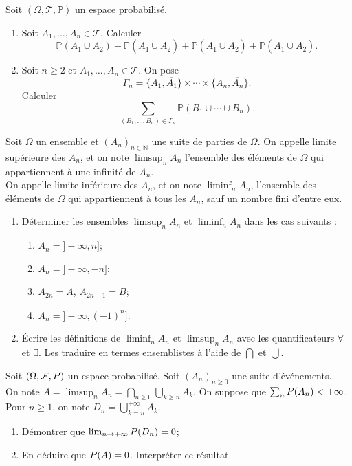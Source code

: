 \documentclass[../PolyS4.tex]{subfiles}
\begin{document}
Soit $(\Omega,\mathcal T,\mathbb{P})$ un espace probabilisé.
\begin{enumerate}
\item Soit $A_1,\dots,A_n\in\mathcal T.$ Calculer 
$$\mathbb{P}(A_1\cup A_2)+\mathbb{P}(\overline{A_1}\cup A_2)+\mathbb{P}(A_1\cup \overline{A_2})+\mathbb{P}(\overline{A_1}\cup\overline{A_2}).$$
\item Soit $n\geq 2$ et $A_1,\dots,A_n\in\mathcal T.$ On pose 
$$\Gamma_n=\{A_1,\overline{A_1}\}\times\cdots\times \{A_n,\overline{A_n}\}.$$
Calculer 
$$\sum_{(B_1,\dots,B_n)\in\Gamma_n}\mathbb{P}(B_1\cup\cdots\cup B_n).$$
\end{enumerate}




Soit $\Omega$ un ensemble et $(A_n)_{n\in\mathbb N}$ une suite de parties de $\Omega$. On appelle limite supérieure des $A_n$, et on note $\limsup_n A_n$ l'ensemble des éléments de $\Omega$ qui appartiennent à une infinité de $A_n$.\\ 
On appelle limite inférieure des $A_n$, et on note $\liminf_n A_n$, l'ensemble des éléments de $\Omega$ qui appartiennent à tous les $A_n$, sauf un nombre fini d'entre eux.\\
\begin{enumerate}
 \item Déterminer les ensembles $\limsup_n A_n$ et $\liminf_n A_n$ dans les cas suivants :
\begin{enumerate}
\item $A_n=]-\infty,n]$;
\item $A_n=]-\infty,-n]$;
\item $A_{2n}=A$, $A_{2n+1}=B$;
\item $A_n=]-\infty,(-1)^n]$. 
\end{enumerate}
\item \'Ecrire les définitions de $\liminf_n A_n$ et $\limsup_n A_n$ avec les quantificateurs
$\forall$ et $\exists$. Les traduire en termes ensemblistes à l'aide de $\bigcap$ et $\bigcup$.\\
\end{enumerate}





Soit $(\Omega,\mathcal F,\mathbb \mathbb{P})$ un espace probabilisé. Soit $(A_n)_{n\geq 0}$ une suite d'événements.\\
On note $A=\limsup_n A_n=\bigcap_{n\geq 0}\bigcup_{k\geq n}A_k$. On suppose que $\sum_n \mathbb \mathbb{P}(A_n)<+\infty$. Pour $n\geq 1$, on note 
$D_n=\bigcup_{k=n}^{+\infty}A_k$.
\begin{enumerate}
 \item Démontrer que $\lim_{n\to+\infty}\mathbb \mathbb{P}(D_n)=0$;
\item En déduire que $\mathbb \mathbb{P}(A)=0$. Interpréter ce résultat.\\
\end{enumerate}
\end{document}
